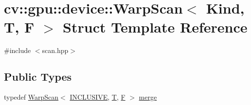 \hypertarget{structcv_1_1gpu_1_1device_1_1WarpScan}{\section{cv\-:\-:gpu\-:\-:device\-:\-:Warp\-Scan$<$ Kind, T, F $>$ Struct Template Reference}
\label{structcv_1_1gpu_1_1device_1_1WarpScan}
}


{\ttfamily \#include $<$scan.\-hpp$>$}

\subsection*{Public Types}
\begin{DoxyCompactItemize}
\item 
typedef \hyperlink{structcv_1_1gpu_1_1device_1_1WarpScan}{Warp\-Scan}$<$ \hyperlink{namespacecv_1_1gpu_1_1device_a28816cb295b05f754b37820576d20aefa2c3c91d1e8338cd34af5d45feb97bdf7}{I\-N\-C\-L\-U\-S\-I\-V\-E}, \hyperlink{calib3d_8hpp_a3efb9551a871ddd0463079a808916717}{T}, \hyperlink{calib3d_8hpp_acc93c21c0e709826b318c946961af8fc}{F} $>$ \hyperlink{structcv_1_1gpu_1_1device_1_1WarpScan_acf969950d6f4c09c21ae86b0e7a64580}{merge}
\end{DoxyCompactItemize}
